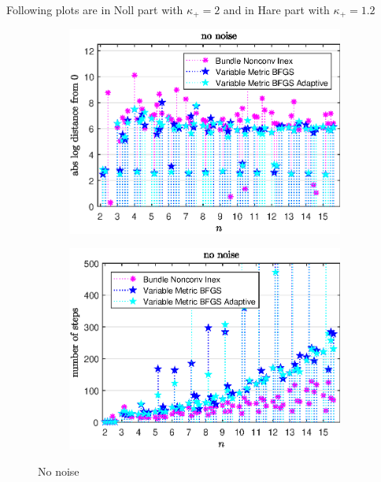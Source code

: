 Following plots are in Noll part with \(\kappa_+ = 2\) and in Hare part with \(\kappa_+ = 1.2\)
\begin{figure}[H]%
	\begin{subfigure}{0.49\textwidth}
		\includegraphics[width=\textwidth]{Pictures/Plots/no_noise.eps}%
	\end{subfigure}
	\begin{subfigure}{0.49\textwidth}
		\includegraphics[width=\textwidth]{Pictures/Plots/steps_no_noise.eps}%
	\end{subfigure}
	\label{fig_no_noise}
	\caption{No noise}
\end{figure}

